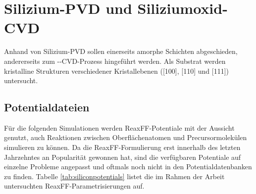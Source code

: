 \section{Silizium-PVD und Siliziumoxid-CVD}
\label{siliconpvd}

Anhand von Silizium-PVD sollen einerseits amorphe Schichten abgeschieden, andererseits zum --CVD-Prozess hingeführt werden.
Als Substrat werden kristalline Strukturen verschiedener Kristallebenen ([100], [110] und [111]) untersucht.

\subsection{Potentialdateien}

Für die folgenden Simulationen werden ReaxFF-Potentiale mit der Aussicht genutzt, auch Reaktionen zwischen Oberflächenatomen und Precursormolekülen simulieren zu können.
Da die ReaxFF-Formulierung erst innerhalb des letzten Jahrzehntes an Popularität gewonnen hat, sind die verfügbaren Potentiale auf einzelne Probleme angepasst und oftmals noch nicht in den Potentialdatenbanken zu finden.
Tabelle \ref{tab:siliconpotentials} listet die im Rahmen der Arbeit untersuchten ReaxFF-Parametrisierungen auf.

